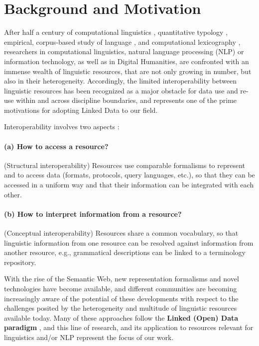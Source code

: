 \section{Background and Motivation}
\label{sec-background}

After
half a century of computational linguistics \citep{dostert1955georgetown},               %
quantitative typology \citep{greenberg60-quant},
empirical, corpus-based study of language \citep{francis-kucera1964},  and %
computational lexicography \citep{morris1969},
researchers in computational linguistics, natural language processing (NLP) or information technology, as well as in Digital Humanities,
 are confronted with an immense wealth of linguistic resources, that are not only growing in number, but also in their heterogeneity.
Accordingly, the limited interoperability between linguistic resources has been recognized as a major obstacle for data use and 
re-use within and across discipline boundaries, and represents one of the prime motivations for adopting Linked Data to our field. 
 
Interoperability involves two aspects \citep{ide-pustejovsky2010-interoperability}:

\smallskip
\noindent
\paragraph{(a) How to access a resource?} (Structural interoperability)
Resources use comparable formalisms to represent and to access data (formats, protocols, query languages, etc.), so that they can be accessed in a uniform way and that their information can be integrated with each other.

\smallskip
\noindent
\paragraph{(b) How to interpret information from a resource?} ({Conceptual} interoperability)
Resources share a common vocabulary, so that linguistic information from one resource can be resolved against information from another resource, e.g., grammatical descriptions can be linked to a terminology repository.

\bigskip

\noindent With the rise of the Semantic Web, new representation formalisms and novel technologies have become available, and different communities are becoming increasingly aware of the potential of these developments with respect to the challenges posited by the heterogeneity and multitude of linguistic resources available today. Many of these approaches follow the \textbf{Linked (Open) Data paradigm} \citep{bernersLee2006_linkeddata}, and this line of research, and its application to resources relevant for linguistics and/or NLP represent the focus of our work.

